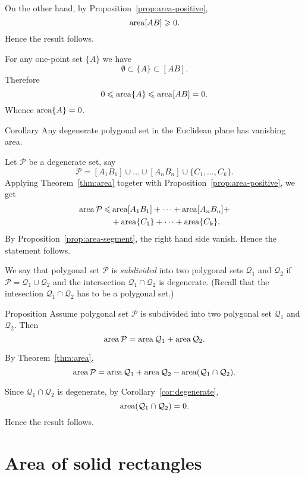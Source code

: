 On the other hand, by Proposition~\ref{prop:area-positive},
\[\mathop{\rm area}\nolimits[AB]\geqslant 0.\]
Hence the result follows.

For any one-point set $\{A\}$ 
we have 
\[\emptyset\subset \{A\}\subset [AB].\]
Therefore 
\[0\leqslant \mathop{\rm area}\nolimits\{A\}\leqslant \mathop{\rm area}\nolimits[AB]=0.\]
Whence $\mathop{\rm area}\nolimits\{A\}=0$.
\qeds

\begin{thm}{Corollary}\label{cor:degenerate}
Any degenerate polygonal set in the Euclidean plane has vanishing area.
\end{thm}

Let $\mathcal P$ be a degenerate set,
say
\[\mathcal{P}=[A_1B_1]\cup\dots\cup[A_nB_n]\cup\{C_1,\dots,C_k\}.\]
Applying Theorem~\ref{thm:area} 
togeter with Proposition~\ref{prop:area-positive},
we get
\begin{align*}
\mathop{\rm area}\nolimits\mathcal{P}\leqslant
& \mathop{\rm area}\nolimits[A_1B_1]+\dots+\mathop{\rm area}\nolimits[A_nB_n]+
\\
&+\mathop{\rm area}\nolimits\{C_1\}+\dots+\mathop{\rm area}\nolimits\{C_k\}.
\end{align*}
By Proposition~\ref{prop:area-segment}, the right hand side vanish.
Hence the statement follows.
\qeds


We say that polygonal set $\mathcal{P}$ is \emph{subdivided} 
into two polygonal sets $\mathcal{Q}_1$ and $\mathcal{Q}_2$ 
if $\mathcal{P}=\mathcal{Q}_1\cup\mathcal{Q}_2$ 
and the intersection $\mathcal{Q}_1\cap\mathcal{Q}_2$ is degenerate.
(Recall that the intesection $\mathcal{Q}_1\cap\mathcal{Q}_2$ has to be a polygonal set.)

\begin{thm}{Proposition}\label{prop:subdivision}
Assume polygonal set $\mathcal{P}$ is subdivided into two polygonal set $\mathcal{Q}_1$ and $\mathcal{Q}_2$.
Then 
\[\mathop{\rm area}\nolimits\mathcal{P}=\mathop{\rm area}\nolimits\mathcal{Q}_1+\mathop{\rm area}\nolimits\mathcal{Q}_2.\]

\end{thm}

By Theorem~\ref{thm:area},
\[\mathop{\rm area}\nolimits\mathcal{P}=\mathop{\rm area}\nolimits\mathcal{Q}_1+\mathop{\rm area}\nolimits\mathcal{Q}_2-\mathop{\rm area}\nolimits(\mathcal{Q}_1\cap\mathcal{Q}_2).\]

Since $\mathcal{Q}_1\cap\mathcal{Q}_2$ is degenerate,
by Corollary~\ref{cor:degenerate},
\[\mathop{\rm area}\nolimits(\mathcal{Q}_1\cap\mathcal{Q}_2)=0.\]
Hence the result follows.
\qeds


\section*{Area of solid rectangles}

